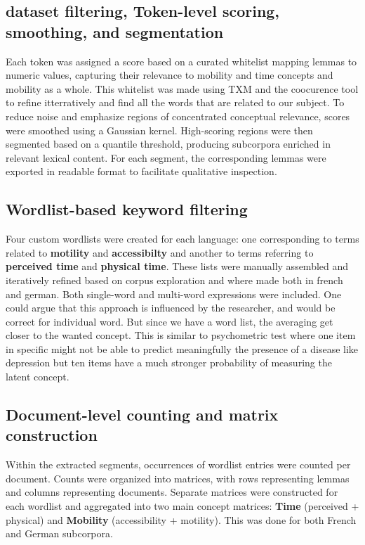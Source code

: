 \subsection{dataset filtering, Token-level scoring, smoothing, and segmentation}

Each token was assigned a score based on a curated whitelist mapping lemmas to numeric values, capturing their relevance to mobility and time concepts and mobility as a whole. This whitelist was made using TXM and the coocurence tool to refine itterratively and find all the words that are related to our subject. To reduce noise and emphasize regions of concentrated conceptual relevance, scores were smoothed using a Gaussian kernel. High-scoring regions were then segmented based on a quantile threshold, producing subcorpora enriched in relevant lexical content. For each segment, the corresponding lemmas were exported in readable format to facilitate qualitative inspection.

\newpage

\subsection{Wordlist-based keyword filtering}

Four custom wordlists were created for each language: one corresponding to terms related to \textbf{motility} and \textbf{accessibilty} and another to terms referring to \textbf{perceived time} and \textbf{physical time}. These lists were manually assembled and iteratively refined based on corpus exploration and where made both in french and german. Both single-word and multi-word expressions were included. One could argue that this approach is influenced by the researcher, and would be correct for individual word. But since we have a word list, the averaging get closer to the wanted concept. This is similar to psychometric test where one item in specific might not be able to predict meaningfully the presence of a disease like depression but ten items have a much stronger probability of measuring the latent concept.

\subsection{Document-level counting and matrix construction}

Within the extracted segments, occurrences of wordlist entries were counted per document. Counts were organized into matrices, with rows representing lemmas and columns representing documents. Separate matrices were constructed for each wordlist and aggregated into two main concept matrices: \textbf{Time} (perceived + physical) and \textbf{Mobility} (accessibility + motility). This was done for both French and German subcorpora.

